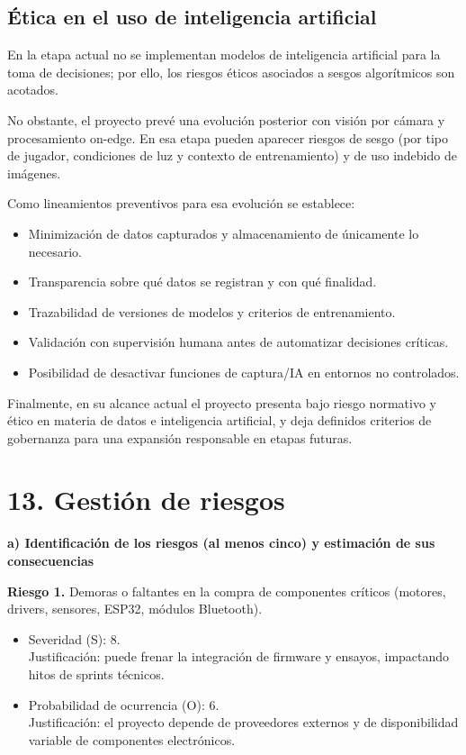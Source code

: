﻿\documentclass[
11pt, %
]{charter}
\begin{document}
\subsection{Ética en el uso de inteligencia artificial}
En la etapa actual no se implementan modelos de inteligencia artificial para la toma de decisiones; por ello, los riesgos éticos asociados a sesgos algorítmicos son acotados.

No obstante, el proyecto prevé una evolución posterior con visión por cámara y procesamiento on-edge. En esa etapa pueden aparecer riesgos de sesgo (por tipo de jugador, condiciones de luz y contexto de entrenamiento) y de uso indebido de imágenes.

Como lineamientos preventivos para esa evolución se establece:

\begin{itemize}
	\item Minimización de datos capturados y almacenamiento de únicamente lo necesario.
	\item Transparencia sobre qué datos se registran y con qué finalidad.
	\item Trazabilidad de versiones de modelos y criterios de entrenamiento.
	\item Validación con supervisión humana antes de automatizar decisiones críticas.
	\item Posibilidad de desactivar funciones de captura/IA en entornos no controlados.
\end{itemize}

Finalmente, en su alcance actual el proyecto presenta bajo riesgo normativo y ético en materia de datos e inteligencia artificial, y deja definidos criterios de gobernanza para una expansión responsable en etapas futuras.


\section{13. Gestión de riesgos}
\label{sec:riesgos}

\textbf{a) Identificación de los riesgos (al menos cinco) y estimación de sus consecuencias}

\textbf{Riesgo 1.} Demoras o faltantes en la compra de componentes críticos (motores, drivers, sensores, ESP32, módulos Bluetooth).
\begin{itemize}
	\item Severidad (S): 8.\\
	Justificación: puede frenar la integración de firmware y ensayos, impactando hitos de sprints técnicos.
	\item Probabilidad de ocurrencia (O): 6.\\
	Justificación: el proyecto depende de proveedores externos y de disponibilidad variable de componentes electrónicos.
\end{itemize}
\end{document}
